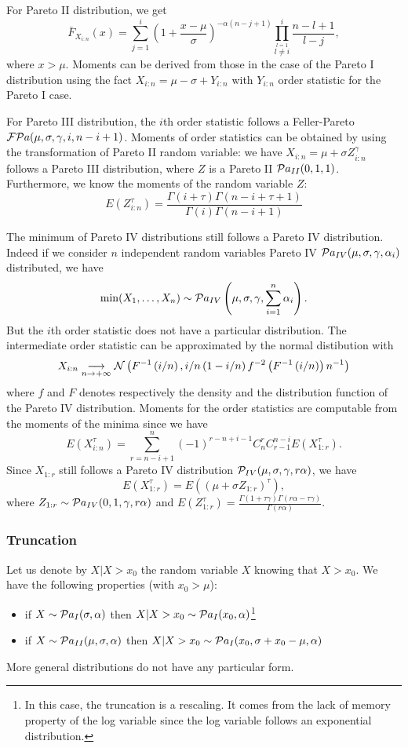 For Pareto II distribution, we get
$$
\bar F_{X_{i:n}}(x) = \sum_{j=1}^i \left(1+\frac{x-\mu}{\sigma}\right)^{-\alpha(n-j+1)} \prod_{\stackrel{l=1}{l\neq i}}^{i}\frac{n-l+1}{l-j},
$$
where $x>\mu$. Moments can be derived from those in the case of the Pareto I distribution using the fact $X_{i:n} = \mu-\sigma+Y_{i:n}$ with $Y_{i:n}$ order statistic for the Pareto I case.

For Pareto III distribution, the $i$th order statistic follows a Feller-Pareto $\mathcal F\mathcal Pa(\mu, \sigma, \gamma, i, n-i+1)$. Moments of order statistics can be obtained by using the transformation  of Pareto II random variable: we have $X_{i:n}=\mu+\sigma Z_{i:n}^\gamma$ follows a Pareto III distribution, where $Z$ is a Pareto II $\mathcal Pa_{II}(0, 1, 1)$. Furthermore, we know the moments of the random variable $Z$:
$$
E(Z_{i:n}^\tau) = \frac{\Gamma(i+\tau)\Gamma(n-i+\tau+1)}{\Gamma(i)\Gamma(n-i+1)}
$$

The minimum of Pareto IV distributions still follows a Pareto IV distribution. Indeed if we consider $n$ independent random variables Pareto IV $\mathcal Pa_{IV}(\mu, \sigma, \gamma, \alpha_i)$ distributed, we have
$$
\min(X_1,\dots,X_n)\sim \mathcal Pa_{IV}\left(\mu, \sigma, \gamma, \sum_{i=1}^n\alpha_i\right).
$$
But the $i$th order statistic does not have a particular distribution. The intermediate order statistic can be approximated by the normal distibution with 
$$
X_{i:n} \underset{n\rightarrow +\infty}{\longrightarrow} \mathcal N\left(F^{-1}\left(i/n\right),i/n\left(1-i/n\right)f^{-2}\left(F^{-1}\left(i/n\right)\right) n^{-1} \right)
$$
where $f$ and $F$ denotes respectively the density and the distribution function of the Pareto IV distribution.
Moments for the order statistics are computable from the moments of the minima since we have
$$
E(X_{i:n}^\tau) = \sum_{r=n-i+1}^n(-1)^{r-n+i-1} C_n^r C_{r-1}^{n-i} E(X_{1:r}^\tau).
$$
Since $X_{1:r}$ still follows a Pareto IV distribution $\mathcal P_{IV}(\mu, \sigma, \gamma, r\alpha)$, we have
$$
E(X_{1:r}^\tau) = E((\mu+\sigma Z_{1:r})^\tau),
$$
where $Z_{1:r} \sim \mathcal Pa_{IV}(0, 1, \gamma, r\alpha)$ and $E(Z_{1:r}^\tau)=\frac{\Gamma(1+\tau\gamma) \Gamma(r\alpha-\tau\gamma)}{\Gamma(r\alpha)}$.



\subsubsection{Truncation}
Let us denote by $X | X>x_0$ the random variable $X$ knowing that $X>x_0$. We have the following properties (with $x_0>\mu$):
\begin{itemize}
\item if $X\sim \mathcal Pa_I(\sigma, \alpha)$ then $X | X>x_0\sim \mathcal Pa_I(x_0, \alpha)$\footnote{In this case, the truncation is a rescaling. It comes from the lack of memory property of the log variable since the log variable follows an exponential distribution.}
\item if $X\sim \mathcal Pa_{II}(\mu, \sigma, \alpha)$ then $X | X>x_0\sim \mathcal Pa_I(x_0, \sigma+x_0-\mu, \alpha)$
\end{itemize}
More general distributions do not have any particular form.

